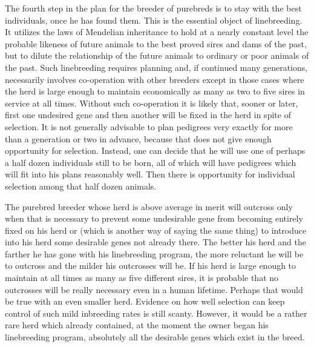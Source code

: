 The fourth step in the plan for the breeder of purebreds is to stay
with the best individuals, once he has found them. This is the essential
object of linebreeding. It utilizes the laws of Mendelian inheritance to
hold at a nearly constant level the probable likeness of future animals
to the best proved sires and dams of the past, but to dilute the relationship
of the future animals to ordinary or poor animals of the past. Such
linebreeding requires planning and, if continued many generations,
necessarily involves co-operation with other breeders except in those
cases where the herd is large enough to maintain economically as many
as two to five sires in service at all times. Without such co-operation it
is likely that, sooner or later, first one undesired gene and then another
will be fixed in the herd in spite of selection. It is not generally advisable
to plan pedigrees very exactly for more than a generation or two in
advance, because that does not give enough opportunity for selection.
Instead, one can decide that he will use one of perhaps a half dozen
individuals still to be born, all of which will have pedigrees which will
fit into his plans reasonably well. Then there is opportunity for individual
selection among that half dozen animals.

The purebred breeder whose herd is above average in merit will
outcross only when that is necessary to prevent some undesirable gene
from becoming entirely fixed on his herd or (which is another way of
saying the same thing) to introduce into his herd some desirable genes
not already there. The better his herd and the farther he has gone with
his linebreeding program, the more reluctant he will be to outcross and
the milder his outcrosses will be. If his herd is large enough to maintain
at all times as many as five different sires, it is probable that no outcrosses
will be really necessary even in a human lifetime. Perhaps that
would be true with an even smaller herd. Evidence on how well selection
can keep control of such mild inbreeding rates is still scanty. However,
it would be a rather rare herd which already contained, at the
moment the owner began his linebreeding program, absolutely all the
desirable genes which exist in the breed.

